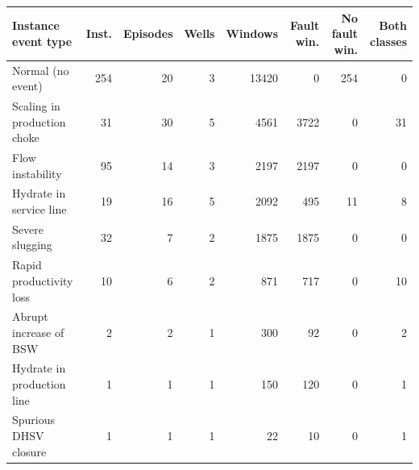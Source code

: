 \begin{tabular}{@{}l rrrrrrr@{}}
\toprule
Instance event type & Inst. & Episodes & Wells & Windows & Fault win. & No fault win. & Both classes \\
\midrule
Normal (no event) & 254 & 20 & 3 & 13420 & 0 & 254 & 0 \\
Scaling in production choke & 31 & 30 & 5 & 4561 & 3722 & 0 & 31 \\
Flow instability & 95 & 14 & 3 & 2197 & 2197 & 0 & 0 \\
Hydrate in service line & 19 & 16 & 5 & 2092 & 495 & 11 & 8 \\
Severe slugging & 32 & 7 & 2 & 1875 & 1875 & 0 & 0 \\
Rapid productivity loss & 10 & 6 & 2 & 871 & 717 & 0 & 10 \\
Abrupt increase of BSW & 2 & 2 & 1 & 300 & 92 & 0 & 2 \\
Hydrate in production line & 1 & 1 & 1 & 150 & 120 & 0 & 1 \\
Spurious DHSV closure & 1 & 1 & 1 & 22 & 10 & 0 & 1 \\
\bottomrule
\end{tabular}
